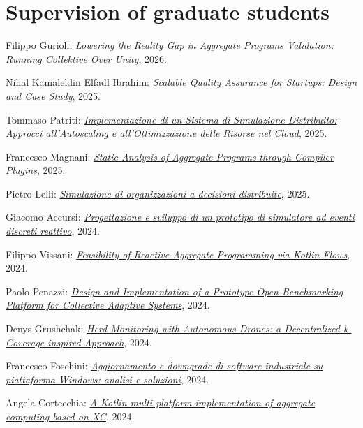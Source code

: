 \section{Supervision of graduate students}
\vspace{-1em}
\begin{innerlist}
    \item Filippo Gurioli: \href{https://amslaurea.unibo.it/38087/}{\textit{Lowering the Reality Gap in Aggregate Programs Validation: Running Collektive Over Unity}}, 2026.
    \item Nihal Kamaleldin Elfadl Ibrahim: \href{https://amslaurea.unibo.it/35535/}{\textit{Scalable Quality Assurance for Startups: Design and Case Study}}, 2025.
    \item Tommaso Patriti: \href{https://amslaurea.unibo.it/34457/}{\textit{Implementazione di un Sistema di Simulazione Distribuito: Approcci all'Autoscaling e all'Ottimizzazione delle Risorse nel Cloud}}, 2025.
    \item Francesco Magnani: \href{https://amslaurea.unibo.it/34470/}{\textit{Static Analysis of Aggregate Programs through Compiler Plugins}}, 2025.
    \item Pietro Lelli: \href{https://amslaurea.unibo.it/34440/}{\textit{Simulazione di organizzazioni a decisioni distribuite}}, 2025.
    \item Giacomo Accursi: \href{https://amslaurea.unibo.it/31065/}{\textit{Progettazione e sviluppo di un prototipo di simulatore ad eventi discreti reattivo}}, 2024.
    \item Filippo Vissani: \href{https://amslaurea.unibo.it/31108/}{\textit{Feasibility of Reactive Aggregate Programming via Kotlin Flows}}, 2024.
    \item Paolo Penazzi: \href{https://amslaurea.unibo.it/31110/}{\textit{Design and Implementation of a Prototype Open Benchmarking Platform for Collective Adaptive Systems}}, 2024.
    \item Denys Grushchak: \href{https://amslaurea.unibo.it/31105/}{\textit{Herd Monitoring with Autonomous Drones: a Decentralized k-Coverage-inspired Approach}}, 2024.
    \item Francesco Foschini: \href{https://amslaurea.unibo.it/31121/}{\textit{Aggiornamento e downgrade di software industriale su piattaforma Windows: analisi e soluzioni}}, 2024.
    \item Angela Cortecchia: \href{https://amslaurea.unibo.it/31080/}{\textit{A Kotlin multi-platform implementation of aggregate computing based on XC}}, 2024.

\end{innerlist}
